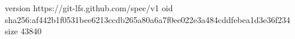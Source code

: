 version https://git-lfs.github.com/spec/v1
oid sha256:af442b1f0531bee6213ccdb265a80a6a7f0ee022e3a484cddfebea1d3e36f234
size 43840

